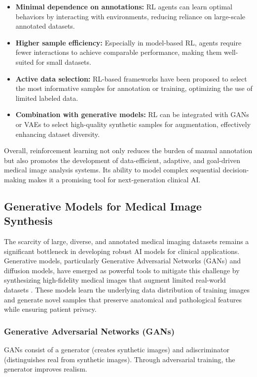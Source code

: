 \documentclass{article}
\begin{document}
\begin{itemize}
    \item \textbf{Minimal dependence on annotations:} RL agents can learn optimal behaviors by interacting with environments, reducing reliance on large-scale annotated datasets.
    \item \textbf{Higher sample efficiency:} Especially in model-based RL, agents require fewer interactions to achieve comparable performance, making them well-suited for small datasets.
    \item \textbf{Active data selection:} RL-based frameworks have been proposed to select the most informative samples for annotation or training, optimizing the use of limited labeled data.
    \item \textbf{Combination with generative models:} RL can be integrated with GANs or VAEs to select high-quality synthetic samples for augmentation, effectively enhancing dataset diversity.
\end{itemize}

Overall, reinforcement learning not only reduces the burden of manual annotation but also promotes the development of data-efficient, adaptive, and goal-driven medical image analysis systems. Its ability to model complex sequential decision-making makes it a promising tool for next-generation clinical AI.



\subsection{Generative Models for Medical Image Synthesis}
The scarcity of large, diverse, and annotated medical imaging datasets remains a significant bottleneck in developing robust AI models for clinical applications. Generative models, particularly ​​Generative Adversarial Networks (GANs)\cite{Goodfellow2014GenerativeAN}​​ and ​​diffusion models​\cite{SohlDickstein2015DeepUL}​, have emerged as powerful tools to mitigate this challenge by synthesizing high-fidelity medical images that augment limited real-world datasets \cite{koetzierGeneratingSyntheticData2024}. These models learn the underlying data distribution of training images and generate novel samples that preserve anatomical and pathological features while ensuring patient privacy.

\subsubsection{Generative Adversarial Networks (GANs)}
GANs consist of a ​​generator​​ (creates synthetic images) and a ​​discriminator​​ (distinguishes real from synthetic images). Through adversarial training, the generator improves realism\cite{Goodfellow2014GenerativeAN}.
\end{document}
